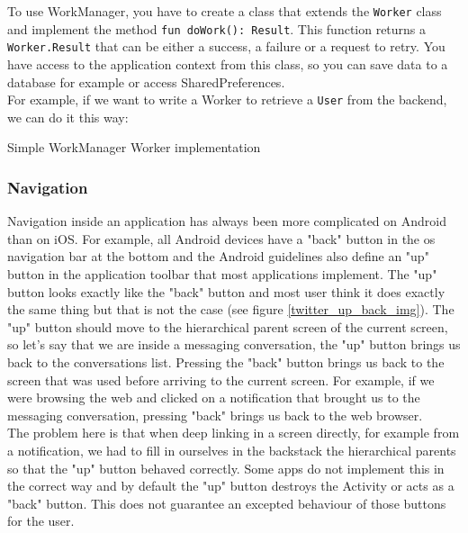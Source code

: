 \documentclass[twoside, openright,11pt,a4paper]{book}
\newenvironment{code}{\captionsetup{type=listing}}{}
\begin{document}
To use WorkManager, you have to create a class that extends the \verb+Worker+ class and implement the method \texttt{fun doWork(): Result}. This function returns a \verb+Worker.Result+ that can be either a success, a failure or a request to retry. You have access to the application context from this class, so you can save data to a database for example or access SharedPreferences.\\

For example, if we want to write a Worker to retrieve a \verb+User+ from the backend, we can do it this way\cite{android:codelab:work_manager}:
\begin{code}
\caption{Simple WorkManager Worker implementation}	
\end{code}
\subsubsection{Navigation}
\label{jetpack_navigation}
Navigation inside an application has always been more complicated on Android than on iOS. For example, all Android devices have a "back" button in the \gls{os} navigation bar at the bottom and the Android guidelines also define an "up" button in the application toolbar that most applications implement. The "up" button looks exactly like the "back" button and most user think it does exactly the same thing but that is not the case (see figure \ref{twitter_up_back_img}). The "up" button should move to the hierarchical parent screen of the current screen, so let's say that we are inside a messaging conversation, the "up" button brings us back to the conversations list. Pressing the "back" button brings us back to the screen that was used before arriving to the current screen. For example, if we were browsing the web and clicked on a notification that brought us to the messaging conversation, pressing "back" brings us back to the web browser.\\

The problem here is that when deep linking in a screen directly, for example from a notification, we had to fill in ourselves in the backstack the hierarchical parents so that the "up" button behaved correctly. Some apps do not implement this in the correct way and by default the "up" button destroys the Activity or acts as a "back" button. This does not guarantee an excepted behaviour of those buttons for the user.\\
\end{document}
